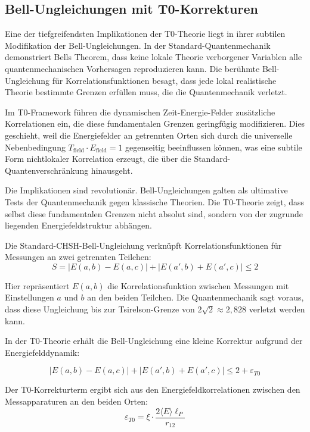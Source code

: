 \documentclass[12pt,a4paper]{article}
\newcommand{\xipar}{\xi}
\theoremstyle{definition}
\theoremstyle{remark}
\begin{document}
\subsection{Bell-Ungleichungen mit T0-Korrekturen}

Eine der tiefgreifendsten Implikationen der T0-Theorie liegt in ihrer subtilen Modifikation der Bell-Ungleichungen. In der Standard-Quantenmechanik demonstriert Bells Theorem, dass keine lokale Theorie verborgener Variablen alle quantenmechanischen Vorhersagen reproduzieren kann. Die berühmte Bell-Ungleichung für Korrelationsfunktionen besagt, dass jede lokal realistische Theorie bestimmte Grenzen erfüllen muss, die die Quantenmechanik verletzt.

Im T0-Framework führen die dynamischen Zeit-Energie-Felder zusätzliche Korrelationen ein, die diese fundamentalen Grenzen geringfügig modifizieren. Dies geschieht, weil die Energiefelder an getrennten Orten sich durch die universelle Nebenbedingung $T_{\text{field}} \cdot E_{\text{field}} = 1$ gegenseitig beeinflussen können, was eine subtile Form nichtlokaler Korrelation erzeugt, die über die Standard-Quantenverschränkung hinausgeht.

Die Implikationen sind revolutionär. Bell-Ungleichungen galten als ultimative Tests der Quantenmechanik gegen klassische Theorien. Die T0-Theorie zeigt, dass selbst diese fundamentalen Grenzen nicht absolut sind, sondern von der zugrunde liegenden Energiefeldstruktur abhängen.

Die Standard-CHSH-Bell-Ungleichung verknüpft Korrelationsfunktionen für Messungen an zwei getrennten Teilchen:
\begin{equation}
	S = |E(a,b) - E(a,c)| + |E(a',b) + E(a',c)| \leq 2
	\label{eq:standard_bell}
\end{equation}

Hier repräsentiert $E(a,b)$ die Korrelationsfunktion zwischen Messungen mit Einstellungen $a$ und $b$ an den beiden Teilchen. Die Quantenmechanik sagt voraus, dass diese Ungleichung bis zur Tsirelson-Grenze von $2\sqrt{2} \approx 2{,}828$ verletzt werden kann.

In der T0-Theorie erhält die Bell-Ungleichung eine kleine Korrektur aufgrund der Energiefelddynamik:

\begin{equation}
	\boxed{|E(a,b) - E(a,c)| + |E(a',b) + E(a',c)| \leq 2 + \varepsilon_{T0}}
	\label{eq:modified_bell}
\end{equation}

Der T0-Korrekturterm ergibt sich aus den Energiefeldkorrelationen zwischen den Messapparaturen an den beiden Orten:
\begin{equation}
	\varepsilon_{T0} = \xipar \cdot \frac{2\langle E \rangle \ell_P}{r_{12}}
	\label{eq:t0_bell_correction}
\end{equation}
\end{document}
